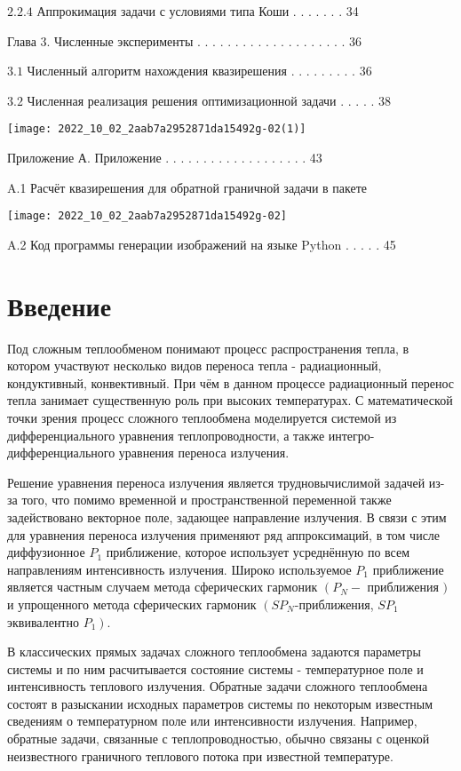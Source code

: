 \documentclass[10pt]{article}
\begin{document}
$2.2 .4$ Аппрокимация задачи с условиями типа Коши . . . . . . . 34

Глава 3. Численные эксперименты . . . . . . . . . . . . . . . . . . . . 36

$3.1$ Численный алгоритм нахождения квазирешения . . . . . . . . . 36

$3.2$ Численная реализация решения оптимизационной задачи . . . . . 38

\begin{center}
\texttt{[image: 2022\_10\_02\_2aab7a2952871da15492g-02(1)]}
\end{center}

Приложение А. Приложение . . . . . . . . . . . . . . . . . . . 43

A.1 Расчёт квазирешения для обратной граничной задачи в пакете

\begin{center}
\texttt{[image: 2022\_10\_02\_2aab7a2952871da15492g-02]}
\end{center}

A.2 Код программы генерации изображений на языке Python . . . . . 45

\section{Введение}
Под сложным теплообменом понимают процесс распространения тепла, в котором участвуют несколько видов переноса тепла - радиационный, кондуктивный, конвективный. При чём в данном процессе радиационный перенос тепла занимает существенную роль при высоких температурах. С математической точки зрения процесс сложного теплообмена моделируется системой из дифференциального уравнения теплопроводности, а также интегро-дифференциального уравнения переноса излучения.

Решение уравнения переноса излучения является трудновычислимой задачей из-за того, что помимо временной и пространственной переменной также задействовано векторное поле, задающее направление излучения. В связи с этим для уравнения переноса излучения применяют ряд аппроксимаций, в том числе диффузионное $P_{1}$ приближение, которое использует усреднённую по всем направлениям интенсивность излучения. Широко используемое $P_{1}$ приближение является частным случаем метода сферических гармоник $\left(P_{N}-\right.$ приближения $)$ и упрощенного метода сферических гармоник $\left(S P_{N}\right.$-приближения, $S P_{1}$ эквивалентно $\left.P_{1}\right)$.

В классических прямых задачах сложного теплообмена задаются параметры системы и по ним расчитывается состояние системы - температурное поле и интенсивность теплового излучения. Обратные задачи сложного теплообмена состоят в разыскании исходных параметров системы по некоторым известным сведениям о температурном поле или интенсивности излучения. Например, обратные задачи, связанные с теплопроводностью, обычно связаны с оценкой неизвестного граничного теплового потока при известной температуре.
\end{document}
